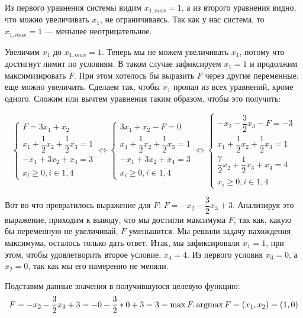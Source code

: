 Из первого уравнения системы видим $x_{1, max} = 1$, а из второго уравнения видно, что можно увеличивать $x_1$, не ограничиваясь.
Так как у нас система, то $x_{1, max} = 1$ --- меньшее неотрицательное.

Увеличим $x_1$ до $x_{1, max} = 1$. Теперь мы не можем увеличивать $x_1$, потому что достигнут лимит по условиям.
В таком случае зафиксируем $x_1 = 1$ и продолжим максимизировать $F$. При этом хотелось бы выразить $F$ через другие переменные,
еще можно увеличить. Сделаем так, чтобы $x_1$ пропал из всех уравнений, кроме одного. Сложим или вычтем уравнения таким образом, чтобы это получить:


\[
    \begin{cases}
        F = 3x_1 + x_2                              \\
        x_1 + \dfrac{1}{2}x_2 + \dfrac{1}{2}x_3 = 1 \\
        -x_1 + 3x_2 + x_4 = 3                       \\
        x_{i} \geq 0, i\in\overline{1,4}
    \end{cases}
    \Leftrightarrow
    \begin{cases}
        3x_1 + x_2 - F = 0                          \\
        x_1 + \dfrac{1}{2}x_2 + \dfrac{1}{2}x_3 = 1 \\
        -x_1 + 3x_2 + x_4 = 3                       \\
        x_{i} \geq 0, i\in\overline{1,4}
    \end{cases}
    \Leftrightarrow
    \begin{cases}
        -x_2 - \dfrac{3}{2}x_3 - F = -3             \\
        x_1 + \dfrac{1}{2}x_2 + \dfrac{1}{2}x_3 = 1 \\
        \dfrac{7}{2}x_2 + \dfrac{1}{2}x_3 + x_4 = 4 \\
        x_{i} \geq 0, i\in\overline{1,4}
    \end{cases}
\]

Вот во что превратилось выражение для $F$: $F = -x_2 - \dfrac{3}{2}x_3 + 3$. Анализируя это выражение, приходим к выводу, что
мы достигли максимума $F$, так как, какую бы переменную не увеличивай, $F$ уменьшится. Мы решили задачу нахождения максимума, осталось только дать ответ.
Итак, мы зафиксировали $x_1 = 1$, при этом, чтобы удовлетворить второе условие, $x_4 = 4$. Из первого условия $x_3 = 0$, а $x_2 = 0$, так как мы его намеренно не меняли.

Подставим данные значения в получившуюся целевую функцию:
$$F = -x_2 - \dfrac{3}{2}x_3 + 3 = -0 - \dfrac{3}{2} * 0 + 3 = 3 = \max F.\\ \operatorname*{argmax} F = (x_1, x_2) = (1, 0)$$

